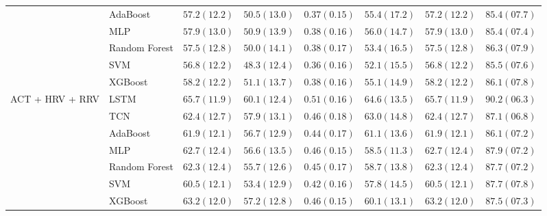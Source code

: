 \begin{tabular}{llllllll}
 & AdaBoost & $57.2 (12.2)$ & $50.5 (13.0)$ & $0.37 (0.15)$ & $55.4 (17.2)$ & $57.2 (12.2)$ & $85.4 (07.7)$ \\
 & MLP & $57.9 (13.0)$ & $50.9 (13.9)$ & $0.38 (0.16)$ & $56.0 (14.7)$ & $57.9 (13.0)$ & $85.4 (07.4)$ \\
 & Random Forest & $57.5 (12.8)$ & $50.0 (14.1)$ & $0.38 (0.17)$ & $53.4 (16.5)$ & $57.5 (12.8)$ & $86.3 (07.9)$ \\
 & SVM & $56.8 (12.2)$ & $48.3 (12.4)$ & $0.36 (0.16)$ & $52.1 (15.5)$ & $56.8 (12.2)$ & $85.5 (07.6)$ \\
 & XGBoost & $58.2 (12.2)$ & $51.1 (13.7)$ & $0.38 (0.16)$ & $55.1 (14.9)$ & $58.2 (12.2)$ & $86.1 (07.8)$ \\
\multirow[c]{7}{*}{ACT + HRV + RRV} & LSTM & $65.7 (11.9)$ & $60.1 (12.4)$ & $0.51 (0.16)$ & $64.6 (13.5)$ & $65.7 (11.9)$ & $90.2 (06.3)$ \\
 & TCN & $62.4 (12.7)$ & $57.9 (13.1)$ & $0.46 (0.18)$ & $63.0 (14.8)$ & $62.4 (12.7)$ & $87.1 (06.8)$ \\
 & AdaBoost & $61.9 (12.1)$ & $56.7 (12.9)$ & $0.44 (0.17)$ & $61.1 (13.6)$ & $61.9 (12.1)$ & $86.1 (07.2)$ \\
 & MLP & $62.7 (12.4)$ & $56.6 (13.5)$ & $0.46 (0.15)$ & $58.5 (11.3)$ & $62.7 (12.4)$ & $87.9 (07.2)$ \\
 & Random Forest & $62.3 (12.4)$ & $55.7 (12.6)$ & $0.45 (0.17)$ & $58.7 (13.8)$ & $62.3 (12.4)$ & $87.7 (07.2)$ \\
 & SVM & $60.5 (12.1)$ & $53.4 (12.9)$ & $0.42 (0.16)$ & $57.8 (14.5)$ & $60.5 (12.1)$ & $87.7 (07.8)$ \\
 & XGBoost & $63.2 (12.0)$ & $57.2 (12.8)$ & $0.46 (0.15)$ & $60.1 (13.1)$ & $63.2 (12.0)$ & $87.5 (07.3)$ \\
\end{tabular}
